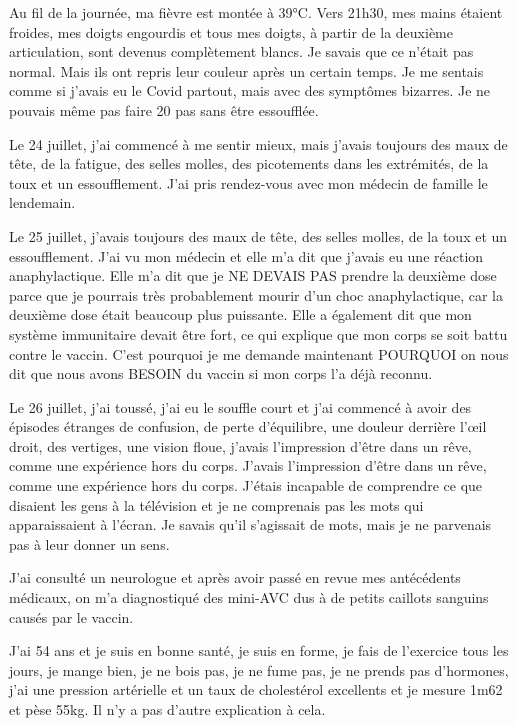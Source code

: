 {Au fil de la journée, ma fièvre est montée à 39°C. Vers 21h30, mes mains étaient
froides, mes doigts engourdis et tous mes doigts, à partir de la deuxième
articulation, sont devenus complètement blancs. Je savais que ce n'était pas
normal. Mais ils ont repris leur couleur après un certain temps. Je me sentais
comme si j'avais eu le Covid partout, mais avec des symptômes bizarres. Je ne
pouvais même pas faire 20 pas sans être essoufflée.

Le 24 juillet, j'ai commencé à me sentir mieux, mais j'avais toujours des maux
de tête, de la fatigue, des selles molles, des picotements dans les extrémités,
de la toux et un essoufflement. J'ai pris rendez-vous avec mon médecin de
famille le lendemain.

Le 25 juillet, j'avais toujours des maux de tête, des selles molles, de la toux
et un essoufflement. J'ai vu mon médecin et elle m'a dit que j'avais eu une
réaction anaphylactique. Elle m'a dit que je NE DEVAIS PAS prendre la deuxième
dose parce que je pourrais très probablement mourir d'un choc anaphylactique,
car la deuxième dose était beaucoup plus puissante. Elle a également dit que mon
système immunitaire devait être fort, ce qui explique que mon corps se soit
battu contre le vaccin. C'est pourquoi je me demande maintenant POURQUOI on nous
dit que nous avons BESOIN du vaccin si mon corps l'a déjà reconnu.

Le 26 juillet, j'ai toussé, j'ai eu le souffle court et j'ai commencé à avoir
des épisodes étranges de confusion, de perte d'équilibre, une douleur derrière
l'œil droit, des vertiges, une vision floue, j'avais l'impression d'être dans un
rêve, comme une expérience hors du corps. J'avais l'impression d'être dans un
rêve, comme une expérience hors du corps. J'étais incapable de comprendre ce que
disaient les gens à la télévision et je ne comprenais pas les mots qui
apparaissaient à l'écran. Je savais qu'il s'agissait de mots, mais je ne
parvenais pas à leur donner un sens.

J'ai consulté un neurologue et après avoir passé en revue mes antécédents
médicaux, on m'a diagnostiqué des mini-AVC dus à de petits caillots sanguins
causés par le vaccin.

J'ai 54 ans et je suis en bonne santé, je suis en forme, je fais de l'exercice
tous les jours, je mange bien, je ne bois pas, je ne fume pas, je ne prends pas
d'hormones, j'ai une pression artérielle et un taux de cholestérol excellents et
je mesure 1m62 et pèse 55kg. Il n'y a pas d'autre explication à cela.

}
